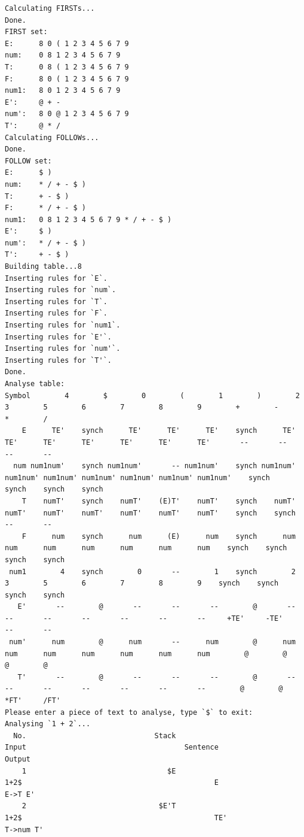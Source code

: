 \documentclass[UTF8]{ctexart}
\begin{document}
\begin{lstlisting}
Calculating FIRSTs...
Done.
FIRST set:
E:      8 0 ( 1 2 3 4 5 6 7 9
num:    0 8 1 2 3 4 5 6 7 9
T:      0 8 ( 1 2 3 4 5 6 7 9
F:      8 0 ( 1 2 3 4 5 6 7 9
num1:   8 0 1 2 3 4 5 6 7 9
E':     @ + -
num':   8 0 @ 1 2 3 4 5 6 7 9
T':     @ * /
Calculating FOLLOWs...
Done.
FOLLOW set:
E:      $ )
num:    * / + - $ )
T:      + - $ )
F:      * / + - $ )
num1:   0 8 1 2 3 4 5 6 7 9 * / + - $ )
E':     $ )
num':   * / + - $ )
T':     + - $ )
Building table...8
Inserting rules for `E`.
Inserting rules for `num`.
Inserting rules for `T`.
Inserting rules for `F`.
Inserting rules for `num1`.
Inserting rules for `E'`.
Inserting rules for `num'`.
Inserting rules for `T'`.
Done.
Analyse table:
Symbol        4        $        0        (        1        )        2        3        5        6        7        8        9        +        -        *        /
    E      TE'    synch      TE'      TE'      TE'    synch      TE'      TE'      TE'      TE'      TE'      TE'      TE'       --       --       --       --
  num num1num'    synch num1num'       -- num1num'    synch num1num' num1num' num1num' num1num' num1num' num1num' num1num'    synch    synch    synch    synch
    T    numT'    synch    numT'    (E)T'    numT'    synch    numT'    numT'    numT'    numT'    numT'    numT'    numT'    synch    synch       --       --
    F      num    synch      num      (E)      num    synch      num      num      num      num      num      num      num    synch    synch    synch    synch
 num1        4    synch        0       --        1    synch        2        3        5        6        7        8        9    synch    synch    synch    synch
   E'       --        @       --       --       --        @       --       --       --       --       --       --       --     +TE'     -TE'       --       --
 num'      num        @      num       --      num        @      num      num      num      num      num      num      num        @        @        @        @
   T'       --        @       --       --       --        @       --       --       --       --       --       --       --        @        @     *FT'     /FT'
Please enter a piece of text to analyse, type `$` to exit:
Analysing `1 + 2`...
  No.                              Stack                                        Input                                     Sentence                   Output
    1                                 $E                                         1+2$                                             E                        E->T E'
    2                               $E'T                                         1+2$                                             TE'                        T->num T'

\end{lstlisting}
\end{document}
